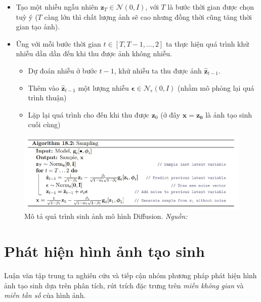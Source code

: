 %
\begin{itemize}
	\item Tạo một nhiễu ngẫu nhiên $\mathbf{z}_T \in \mathcal{N}(0,I)$, với $\mathit{T}$ là bước thời gian được chọn tuỳ ý ($\mathit{T}$ càng lớn thì chất lượng ảnh sẽ cao nhưng đồng thời cũng tăng thời gian tạo ảnh).
	\item Ứng với mỗi bước thời gian $\mathit{t} \in [T,T-1,...,2]$ ta thực hiện quá trình khử nhiễu dần dần đến khi thu được ảnh không nhiễu.
		\begin{itemize}
			\item Dự đoán nhiễu ở bước $\mathit{t-1}$, khử nhiễu ta thu được ảnh $\mathbf{\hat{z}}_{t-1}$.
			\item Thêm vào $\mathbf{\hat{z}}_{t-1}$ một lượng nhiễu $\mathbf{\epsilon} \in \mathcal{N}_\epsilon(0,I)$ (nhằm mô phỏng lại quá trình thuận)
			\item Lặp lại quá trình cho đến khi thu được $\mathbf{z}_0$ (ở đây $\mathbf{x=z_0}$ là ảnh tạo sinh cuối cùng)
		\end{itemize}

\end{itemize}
%
\begin{figure}[htp]
	\centering
	\includegraphics[width=0.9\linewidth]{Images/model-diffusion-sampling-1.png}
	\caption{
		Mô tả quá trình sinh ảnh mô hình Diffusion.
		\textit{Nguồn: \cite{prince2023understanding}}
	}
	\label{fig:model-diffusion-sampling-1}
\end{figure}
%
\section{Phát hiện hình ảnh tạo sinh}
%
Luận văn tập trung ta nghiên cứu và tiếp cận nhóm phương pháp phát hiện hình ảnh tạo sinh dựa trên phân tích, rút trích đặc trưng trên \textit{miền không gian} và \textit{miền tần số} của hình ảnh.
%
%
